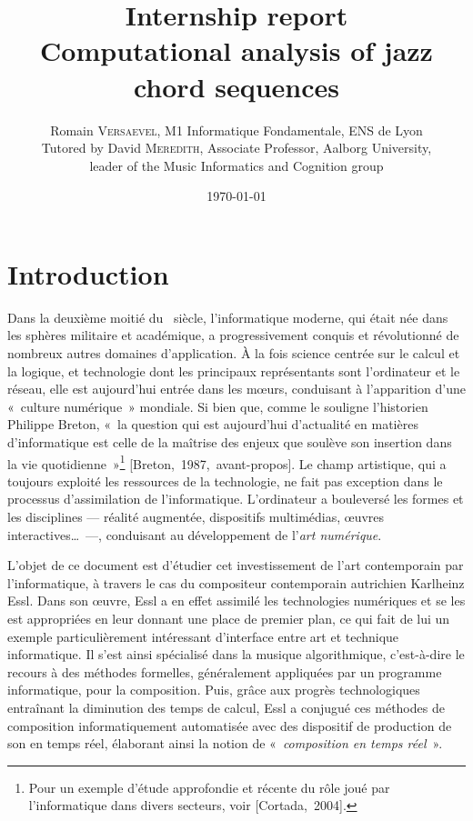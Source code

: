 \documentclass[a4paper,12pt]{article}
\title{\Large Internship report \\ \LARGE Computational analysis of jazz chord sequences}
\author{\normalsize Romain \textsc{Versaevel}, M1 Informatique Fondamentale, ENS de Lyon\\
\normalsize Tutored by David \textsc{Meredith}, Associate Professor, Aalborg University,\\
\normalsize leader of the Music Informatics and Cognition group\\}
\date{\today}
\newcommand{\guill}[1]{«~#1~»}
\newcommand{\cicite}[1]{{\footnotesize[#1]}}
\begin{document}

\tableofcontents

\newpage

\section{Introduction}

Dans la deuxième moitié du \XXe~siècle, l'informatique moderne, qui était née dans les sphères militaire et académique, a progressivement conquis et révolutionné de nombreux autres domaines d'application. À la fois science centrée sur le calcul et la logique, et technologie dont les principaux représentants sont l'ordinateur et le réseau, elle est aujourd'hui entrée dans les mœurs, conduisant à l'apparition d'une \guill{culture numérique} mondiale. Si bien que, comme le souligne l'historien Philippe Breton, \guill{la question qui est aujourd’hui d'actualité en matières d'informatique est celle de la maîtrise des enjeux que soulève son insertion dans la vie quotidienne}\footnote{Pour un exemple d'étude approfondie et récente du rôle joué par l'informatique dans divers secteurs, voir \cicite{Cortada,~2004}.} \cicite{Breton,~1987,~avant-propos}. Le champ artistique, qui a toujours exploité les ressources de la technologie, ne fait pas exception dans le processus d'assimilation de l'informatique. L'ordinateur a bouleversé les formes et les disciplines --- réalité augmentée, dispositifs multimédias, œuvres interactives\dots~---, conduisant au développement de l'\emph{art numérique}.

L'objet de ce document est d'étudier cet investissement de l'art contemporain par l'informatique, à travers le cas du compositeur contemporain autrichien Karlheinz Essl. Dans son œuvre, Essl a en effet assimilé les technologies numériques et se les est appropriées en leur donnant une place de premier plan, ce qui fait de lui un exemple particulièrement intéressant d'interface entre art et technique informatique. Il s'est ainsi spécialisé dans la musique algorithmique, c'est-à-dire le recours à des méthodes formelles, généralement appliquées par un programme informatique, pour la composition. Puis, grâce aux progrès technologiques entraînant la diminution des temps de calcul, Essl a conjugué ces méthodes de composition informatiquement automatisée avec des dispositif de production de son en temps réel, élaborant ainsi la notion de \guill{\emph{composition en temps réel}}.
\end{document}
